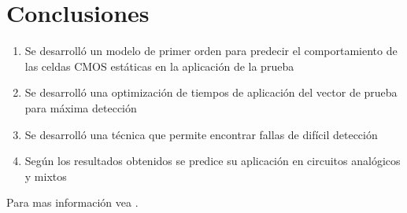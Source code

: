 \documentclass[
paper=128mm:96mm, %
fontsize=11pt, %
pagesize, %
parskip=half-, %
]{scrartcl} %
\theoremstyle{mythmstyle} %
\begin{document}
\clearpage

\section{Conclusiones}
\label{sec:conclusion}

\begin{enumerate}
\item Se desarrolló un modelo de primer orden para predecir el
  comportamiento de las celdas CMOS estáticas en la aplicación de la
  prueba
\item Se desarrolló una optimización de tiempos de aplicación del
  vector de prueba para máxima detección
\item Se desarrolló una técnica que permite encontrar fallas de
  difícil detección
\item Según los resultados obtenidos se predice su aplicación en
  circuitos analógicos y mixtos
\end{enumerate}

Para mas información vea \cite{Mendoza2000}.

\clearpage




\thispagestyle{empty} %

\end{document}
